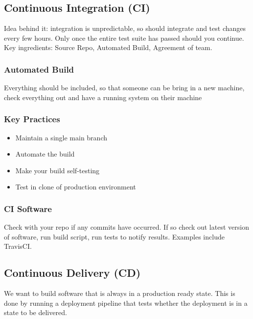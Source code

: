 \documentclass{article}
\begin{document}
\subsection{Continuous Integration (CI)}
Idea behind it: integration is unpredictable, so should integrate and test changes every few hours. Only once the entire test suite has passed should you continue. \\
Key ingredients: Source Repo, Automated Build, Agreement of team. 
\subsubsection{Automated Build} 
Everything should be included, so that someone can be bring in a new machine, check everything out and have a running system on their machine 
\subsubsection{Key Practices} 
\begin{itemize}
    \item Maintain a single main branch
    \item Automate the build
    \item Make your build self-testing
    \item Test in clone of production environment
\end{itemize}
\subsubsection{CI Software} 
Check with your repo if any commits have occurred. If so check out latest version of software, run build script, run tests to notify results. Examples include TravisCI.
\subsection{Continuous Delivery (CD)}
We want to build software that is always in a production ready state. This is done by running a deployment pipeline that tests whether the deployment is in a state to be delivered.
\end{document}
